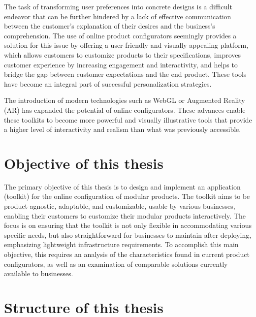 The task of transforming user preferences into concrete designs is a difficult endeavor that can be further hindered by a lack of effective communication between the customer's explanation of their desires and the business's comprehension. The use of online product configurators seemingly provides a solution for this issue by offering a user-friendly and visually appealing platform, which allows customers to customize products to their specifications, improves customer experience by increasing engagement and interactivity, and helps to bridge the gap between customer expectations and the end product. These tools have become an integral part of successful personalization strategies. \cite{Franke2003}

The introduction of modern technologies such as WebGL or Augmented Reality (AR) has expanded the potential of online configurators. These advances enable these toolkits to become more powerful and visually illustrative tools that provide a higher level of interactivity and realism than what was previously accessible. \cite{Cozzi2015}

\section{Objective of this thesis}

The primary objective of this thesis is to design and implement an application (toolkit) for the online configuration of modular products. The toolkit aims to be product-agnostic, adaptable, and customizable, usable by various businesses, enabling their customers to customize their modular products interactively. The focus is on ensuring that the toolkit is not only flexible in accommodating various specific needs, but also straightforward for businesses to maintain after deploying, emphasizing lightweight infrastructure requirements. 
To accomplish this main objective, this requires an analysis of the characteristics found in current product configurators, as well as an examination of comparable solutions currently available to businesses.

\section{Structure of this thesis}

